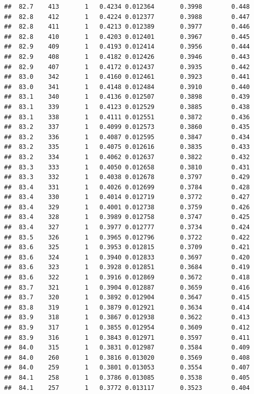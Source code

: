 \documentclass[
]{book}
\begin{document}
\begin{verbatim}
##  82.7    413       1   0.4234 0.012364       0.3998        0.448
##  82.8    412       1   0.4224 0.012377       0.3988        0.447
##  82.8    411       1   0.4213 0.012389       0.3977        0.446
##  82.8    410       1   0.4203 0.012401       0.3967        0.445
##  82.9    409       1   0.4193 0.012414       0.3956        0.444
##  82.9    408       1   0.4182 0.012426       0.3946        0.443
##  82.9    407       1   0.4172 0.012437       0.3935        0.442
##  83.0    342       1   0.4160 0.012461       0.3923        0.441
##  83.0    341       1   0.4148 0.012484       0.3910        0.440
##  83.1    340       1   0.4136 0.012507       0.3898        0.439
##  83.1    339       1   0.4123 0.012529       0.3885        0.438
##  83.1    338       1   0.4111 0.012551       0.3872        0.436
##  83.2    337       1   0.4099 0.012573       0.3860        0.435
##  83.2    336       1   0.4087 0.012595       0.3847        0.434
##  83.2    335       1   0.4075 0.012616       0.3835        0.433
##  83.2    334       1   0.4062 0.012637       0.3822        0.432
##  83.3    333       1   0.4050 0.012658       0.3810        0.431
##  83.3    332       1   0.4038 0.012678       0.3797        0.429
##  83.4    331       1   0.4026 0.012699       0.3784        0.428
##  83.4    330       1   0.4014 0.012719       0.3772        0.427
##  83.4    329       1   0.4001 0.012738       0.3759        0.426
##  83.4    328       1   0.3989 0.012758       0.3747        0.425
##  83.4    327       1   0.3977 0.012777       0.3734        0.424
##  83.5    326       1   0.3965 0.012796       0.3722        0.422
##  83.6    325       1   0.3953 0.012815       0.3709        0.421
##  83.6    324       1   0.3940 0.012833       0.3697        0.420
##  83.6    323       1   0.3928 0.012851       0.3684        0.419
##  83.6    322       1   0.3916 0.012869       0.3672        0.418
##  83.7    321       1   0.3904 0.012887       0.3659        0.416
##  83.7    320       1   0.3892 0.012904       0.3647        0.415
##  83.8    319       1   0.3879 0.012921       0.3634        0.414
##  83.9    318       1   0.3867 0.012938       0.3622        0.413
##  83.9    317       1   0.3855 0.012954       0.3609        0.412
##  83.9    316       1   0.3843 0.012971       0.3597        0.411
##  84.0    315       1   0.3831 0.012987       0.3584        0.409
##  84.0    260       1   0.3816 0.013020       0.3569        0.408
##  84.0    259       1   0.3801 0.013053       0.3554        0.407
##  84.1    258       1   0.3786 0.013085       0.3538        0.405
##  84.1    257       1   0.3772 0.013117       0.3523        0.404

\end{verbatim}
\end{document}
